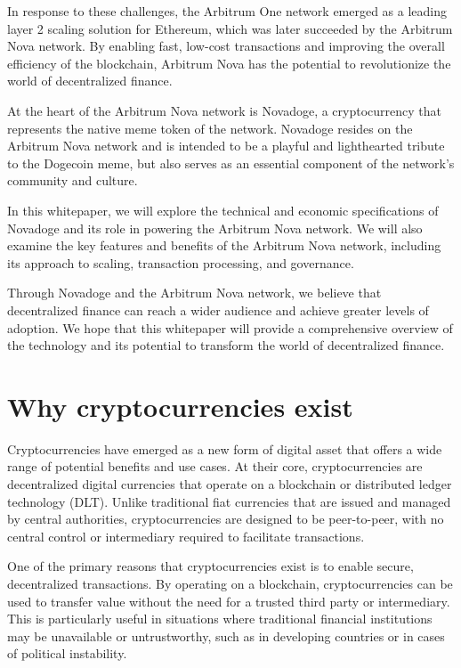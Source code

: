 \documentclass[a4paper, 10pt]{article}
\begin{document}
In response to these challenges, the Arbitrum One network emerged as a leading layer 2 scaling solution for Ethereum, which was later succeeded by the Arbitrum Nova network. By enabling fast, low-cost transactions and improving the overall efficiency of the blockchain, Arbitrum Nova has the potential to revolutionize the world of decentralized finance.

At the heart of the Arbitrum Nova network is Novadoge, a cryptocurrency that represents the native meme token of the network. Novadoge resides on the Arbitrum Nova network and is intended to be a playful and lighthearted tribute to the Dogecoin meme, but also serves as an essential component of the network's community and culture.

In this whitepaper, we will explore the technical and economic specifications of Novadoge and its role in powering the Arbitrum Nova network. We will also examine the key features and benefits of the Arbitrum Nova network, including its approach to scaling, transaction processing, and governance.

Through Novadoge and the Arbitrum Nova network, we believe that decentralized finance can reach a wider audience and achieve greater levels of adoption. We hope that this whitepaper will provide a comprehensive overview of the technology and its potential to transform the world of decentralized finance.

\newpage

\section{Why cryptocurrencies exist}\label{Why cryptocurrencies exist}

Cryptocurrencies have emerged as a new form of digital asset that offers a wide range of potential benefits and use cases. At their core, cryptocurrencies are decentralized digital currencies that operate on a blockchain or distributed ledger technology (DLT). Unlike traditional fiat currencies that are issued and managed by central authorities, cryptocurrencies are designed to be peer-to-peer, with no central control or intermediary required to facilitate transactions.

One of the primary reasons that cryptocurrencies exist is to enable secure, decentralized transactions. By operating on a blockchain, cryptocurrencies can be used to transfer value without the need for a trusted third party or intermediary. This is particularly useful in situations where traditional financial institutions may be unavailable or untrustworthy, such as in developing countries or in cases of political instability.
\end{document}
